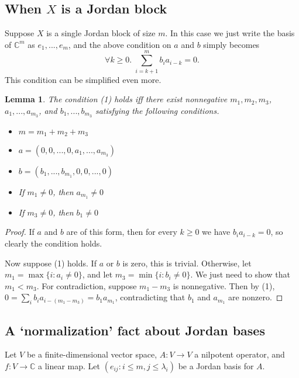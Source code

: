 \documentclass[12pt,psamsfonts]{article}
\newtheorem{lemma}[theorem]{Lemma}
\begin{document}
\subsection{When \(X\) is a Jordan block}
Suppose \(X\) is a single Jordan block of size \(m\).
In this case we just write the basis of \(\mathbb{C}^m\) as \(e_1, ..., e_m\), and the above condition on \(a\) and \(b\) simply becomes
\begin{equation}
    \forall k \geq 0. \; \sum_{i = k + 1}^m b_i a_{i - k} = 0.
\end{equation}
This condition can be simplified even more.
\begin{lemma}
    The condition (1) holds iff there exist nonnegative \(m_1, m_2, m_3\), \(a_1, ..., a_{m_3}\), and \(b_1, ..., b_{m_3}\) satisfying the following conditions.
    \begin{itemize}
        \item \(m = m_1 + m_2 + m_3\)
        \item \(a = (0, 0, ..., 0, a_1, ..., a_{m_3})\)
        \item \(b = (b_1, ..., b_{m_1}, 0, 0, ..., 0)\)
        \item If \(m_1 \neq 0\), then \(a_{m_1} \neq 0\)
        \item If \(m_3 \neq 0\), then \(b_1 \neq 0\)
    \end{itemize}
\end{lemma}
\begin{proof}
    If \(a\) and \(b\) are of this form, then for every \(k \geq 0\) we have \(b_i a_{i - k} = 0\), so clearly the condition holds.
    \par Now suppose (1) holds.
    If \(a\) or \(b\) is zero, this is trivial.
    Otherwise, let \(m_1 = \max\{i : a_i \neq 0\}\), and let \(m_3 = \min\{i : b_i \neq 0\}\).
    We just need to show that \(m_1 < m_3\).
    For contradiction, suppose \(m_1 - m_3\) is nonnegative.
    Then by (1), \(0 = \sum_i b_i a_{i - (m_1 - m_3)} = b_1 a_{m_1}\), contradicting that \(b_1\) and \(a_{m_1}\) are nonzero.
\end{proof}

\subsection{A `normalization' fact about Jordan bases}
Let \(V\) be a finite-dimensional vector space, \(A : V \to V\) a nilpotent operator, and \(f : V \to \mathbb{C}\) a linear map.
Let \((e_{ij} : i \leq m, j \leq \lambda_i)\) be a Jordan basis for \(A\).
\end{document}
